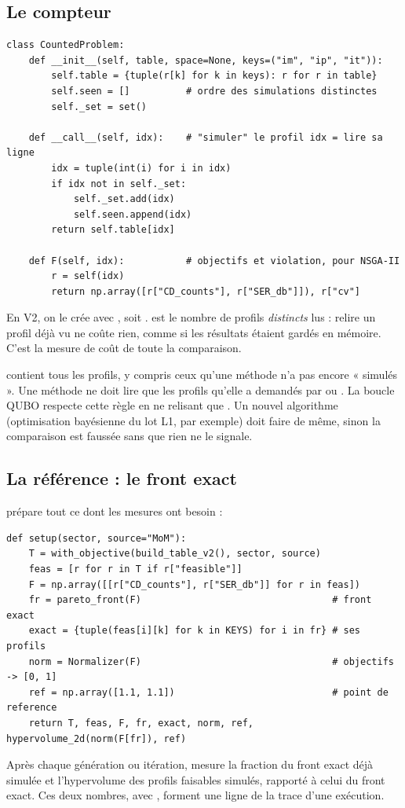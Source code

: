 \subsection{Le compteur}
\begin{lstlisting}
class CountedProblem:
    def __init__(self, table, space=None, keys=("im", "ip", "it")):
        self.table = {tuple(r[k] for k in keys): r for r in table}
        self.seen = []          # ordre des simulations distinctes
        self._set = set()

    def __call__(self, idx):    # "simuler" le profil idx = lire sa ligne
        idx = tuple(int(i) for i in idx)
        if idx not in self._set:
            self._set.add(idx)
            self.seen.append(idx)
        return self.table[idx]

    def F(self, idx):           # objectifs et violation, pour NSGA-II
        r = self(idx)
        return np.array([r["CD_counts"], r["SER_db"]]), r["cv"]
\end{lstlisting}
En V2, on le crée avec , soit .  est le nombre de profils \emph{distincts} lus : relire un profil déjà vu ne coûte rien, comme si les résultats étaient gardés en mémoire. C'est la mesure de coût de toute la comparaison.

\begin{piege}
 contient tous les profils, y compris ceux qu'une méthode n'a pas encore « simulés ». Une méthode ne doit lire que les profils qu'elle a demandés par  ou . La boucle QUBO respecte cette règle en ne relisant que . Un nouvel algorithme (optimisation bayésienne du lot L1, par exemple) doit faire de même, sinon la comparaison est faussée sans que rien ne le signale.
\end{piege}

\subsection{La référence : le front exact}
 prépare tout ce dont les mesures ont besoin :
\begin{lstlisting}
def setup(sector, source="MoM"):
    T = with_objective(build_table_v2(), sector, source)
    feas = [r for r in T if r["feasible"]]
    F = np.array([[r["CD_counts"], r["SER_db"]] for r in feas])
    fr = pareto_front(F)                                  # front exact
    exact = {tuple(feas[i][k] for k in KEYS) for i in fr} # ses profils
    norm = Normalizer(F)                                  # objectifs -> [0, 1]
    ref = np.array([1.1, 1.1])                            # point de reference
    return T, feas, F, fr, exact, norm, ref, hypervolume_2d(norm(F[fr]), ref)
\end{lstlisting}
Après chaque génération ou itération,  mesure la fraction du front exact déjà simulée et l'hypervolume des profils faisables simulés, rapporté à celui du front exact. Ces deux nombres, avec , forment une ligne de la trace d'une exécution.

